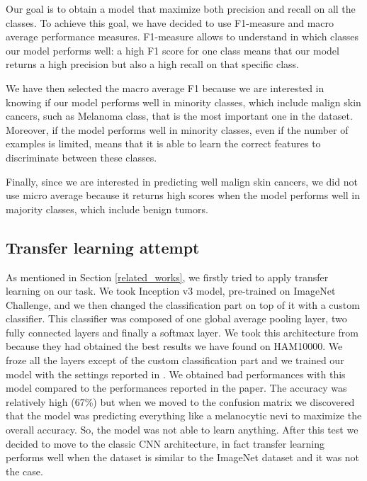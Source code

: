 		\smallskip
		
		Our goal is to obtain a model that maximize both precision and recall on all the classes.
		To achieve this goal, we have decided to use F1-measure and macro average performance measures. F1-measure allows to understand in which classes our model performs well: a high F1 score for one class means that our model returns a high precision but also a high recall on that specific class. 
		
		\smallskip
		
		We have then selected the macro average F1 because we are interested in knowing if our model performs well in minority classes, which include malign skin cancers, such as Melanoma class, that is the most important one in the dataset. 
		Moreover, if the model performs well in minority classes, even if the number of examples is limited, means that it is able to learn the correct features to discriminate between these classes. 
		
		\smallskip
		
		Finally, since we are interested in predicting well malign skin cancers, we did not use micro average because it returns high scores when the model performs well in majority classes, which include benign tumors.
		
	\subsection{Transfer learning attempt}
		
		As mentioned in Section \ref{related_works}, we firstly tried to apply transfer learning on our task. We took Inception v3 model, pre-trained on ImageNet Challenge, and we then changed the classification part on top of it with a custom classifier. This classifier was composed of one global average pooling layer, two fully connected layers and finally a softmax layer. We took this architecture from \cite{article3} because they had obtained the best results we have found on HAM10000. We froze all the layers except of the custom classification part and we trained our model with the settings reported in \cite{article3}. We obtained bad performances with this model compared to the performances reported in the paper. The accuracy was relatively high (67\%) but when we moved to the confusion matrix we discovered that the model was predicting everything like a melanocytic nevi to maximize the overall accuracy. So, the model was not able to learn anything. After this test we decided to move to the classic CNN architecture, in fact transfer learning performs well when the dataset is similar to the ImageNet dataset and it was not the case.
		
